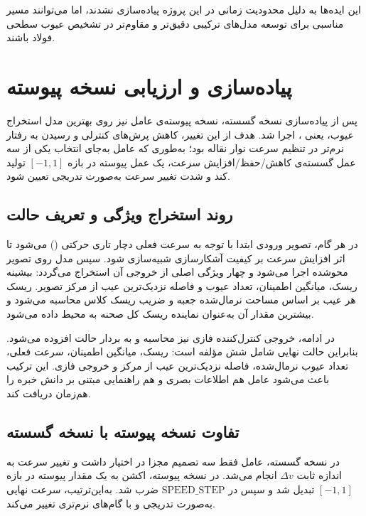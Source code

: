 \documentclass[a4paper, 10pt, twocolumn]{article}
\begin{document}
	این ایده‌ها به دلیل محدودیت زمانی در این پروژه پیاده‌سازی نشدند، اما
	می‌توانند مسیر مناسبی برای توسعه مدل‌های ترکیبی دقیق‌تر و مقاوم‌تر در
	تشخیص عیوب سطحی فولاد باشند.
	
	
	\section{پیاده‌سازی و ارزیابی نسخه پیوسته }
	
	پس از پیاده‌سازی نسخه گسسته، نسخه پیوسته‌ی عامل  نیز روی بهترین
	مدل استخراج عیوب، یعنی ، اجرا شد. هدف از این
	تغییر، کاهش پرش‌های کنترلی و رسیدن به رفتار نرم‌تر در تنظیم سرعت نوار
	نقاله بود؛ به‌طوری که عامل به‌جای انتخاب یکی از سه عمل گسسته‌ی
	کاهش/حفظ/افزایش سرعت، یک عمل پیوسته در بازه \([-1,1]\) تولید کند و شدت
	تغییر سرعت به‌صورت تدریجی تعیین شود.
	
	\subsection{روند استخراج ویژگی و تعریف حالت}
	
	در هر گام، تصویر ورودی ابتدا با توجه به سرعت فعلی دچار تاری حرکتی
	() می‌شود تا اثر افزایش سرعت بر کیفیت آشکارسازی شبیه‌سازی
	شود. سپس مدل  روی تصویر محوشده اجرا می‌شود و چهار ویژگی اصلی
	از خروجی آن استخراج می‌گردد: بیشینه ریسک، میانگین اطمینان،
	تعداد عیوب و فاصله نزدیک‌ترین عیب از مرکز تصویر. ریسک هر عیب بر اساس
	مساحت نرمال‌شده جعبه و ضریب ریسک کلاس محاسبه می‌شود و بیشترین مقدار آن
	به‌عنوان نماینده ریسک کل صحنه به محیط داده می‌شود.
	
	در ادامه، خروجی کنترل‌کننده فازی نیز محاسبه و به بردار حالت افزوده
	می‌شود. بنابراین حالت نهایی شامل شش مؤلفه است:
	ریسک، میانگین اطمینان، سرعت فعلی، تعداد عیوب نرمال‌شده، فاصله نزدیک‌ترین
	عیب از مرکز و خروجی فازی. این ترکیب باعث می‌شود عامل هم اطلاعات بصری
	 و هم راهنمایی مبتنی بر دانش خبره را هم‌زمان دریافت کند.
	
	\subsection{تفاوت نسخه پیوسته با نسخه گسسته}
	
	در نسخه گسسته، عامل فقط سه تصمیم مجزا در اختیار داشت و تغییر سرعت به
	اندازه ثابت \(\Delta v\) انجام می‌شد. در نسخه پیوسته، اکشن به یک مقدار
	پیوسته در بازه \([-1,1]\) تبدیل شد و سپس در \(\mathrm{SPEED\_STEP}\)
	ضرب شد. به‌این‌ترتیب، سرعت نهایی به‌صورت تدریجی و با گام‌های نرم‌تری
	تغییر می‌کند.
	
\end{document}
